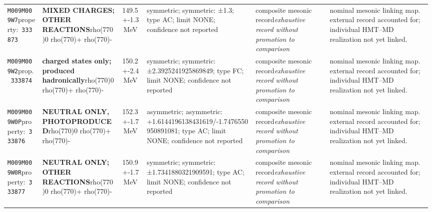 \begin{landscape}
\begin{longtable}{L{1.85cm}L{4.45cm}L{2.35cm}L{4.05cm}L{3.35cm}L{7.15cm}}
\texttt{M009}\newline \texttt{M009W7}\newline property:\ \texttt{333873} & \textbf{MIXED CHARGES; OTHER REACTIONS}\newline rho(770)0 \textbar{}\allowbreak{} rho(770)+ \textbar{}\allowbreak{} rho(770)- & 149.5+-1.3\,MeV & symmetric; symmetric: ±1.3; type AC; limit NONE; confidence not reported & composite mesonic record\newline \emph{exhaustive record without promotion to comparison} & nominal mesonic linking map. external record accounted for; individual HMT--MD realization not yet linked. \\
\texttt{M009}\newline \texttt{M009W2}\newline prop.\ \texttt{333874} & \textbf{charged states only; produced hadronically}\newline rho(770)0 \textbar{}\allowbreak{} rho(770)+ \textbar{}\allowbreak{} rho(770)- & 150.2+-2.4\,MeV & symmetric; symmetric: ±2.3925241925869849; type FC; limit NONE; confidence not reported & composite mesonic record\newline \emph{exhaustive record without promotion to comparison} & nominal mesonic linking map. external record accounted for; individual HMT--MD realization not yet linked. \\
\texttt{M009}\newline \texttt{M009W0P}\newline property:\ \texttt{333876} & \textbf{NEUTRAL ONLY, PHOTOPRODUCED}\newline rho(770)0 \textbar{}\allowbreak{} rho(770)+ \textbar{}\allowbreak{} rho(770)- & 152.3+-1.7\,MeV & asymmetric; asymmetric: +1.6144196138431619/-1.7476550950891081; type AC; limit NONE; confidence not reported & composite mesonic record\newline \emph{exhaustive record without promotion to comparison} & nominal mesonic linking map. external record accounted for; individual HMT--MD realization not yet linked. \\
\texttt{M009}\newline \texttt{M009W0R}\newline property:\ \texttt{333877} & \textbf{NEUTRAL ONLY; OTHER REACTIONS}\newline rho(770)0 \textbar{}\allowbreak{} rho(770)+ \textbar{}\allowbreak{} rho(770)- & 150.9+-1.7\,MeV & symmetric; symmetric: ±1.7341880321909591; type AC; limit NONE; confidence not reported & composite mesonic record\newline \emph{exhaustive record without promotion to comparison} & nominal mesonic linking map. external record accounted for; individual HMT--MD realization not yet linked. \\

\end{longtable}
\end{landscape}
